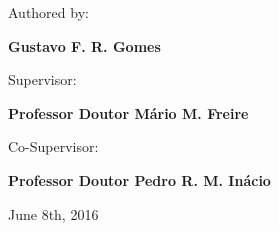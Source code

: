 \vspace{0.5cm}
\begin{center}
\begin{normalsize}
\begin{large}
Authored by:
\end{large}
\end{normalsize}
\end{center}

\vspace{0.2cm}
\begin{center}
\begin{large}
\textbf{Gustavo F. R. Gomes}
\end{large}
\end{center}

\vspace{0,5cm}
\begin{center}
\begin{normalsize}
\begin{large}
Supervisor:
\end{large}
\end{normalsize}
\end{center}

\vspace{0.2cm}
\begin{center}
\begin{large}
\textbf{Professor Doutor Mário M. Freire}
\end{large}
\end{center}

\vspace{0,5cm}
\begin{center}
\begin{normalsize}
\begin{large}
Co-Supervisor:
\end{large}
\end{normalsize}
\end{center}

\vspace{0.2cm}
\begin{center}
\begin{large}
\textbf{Professor Doutor Pedro R. M. Inácio}
\end{large}
\end{center}

\vspace{0.5cm}
\begin{center}
\begin{normalsize}
	June 8th, 2016
\end{normalsize}
\end{center}
